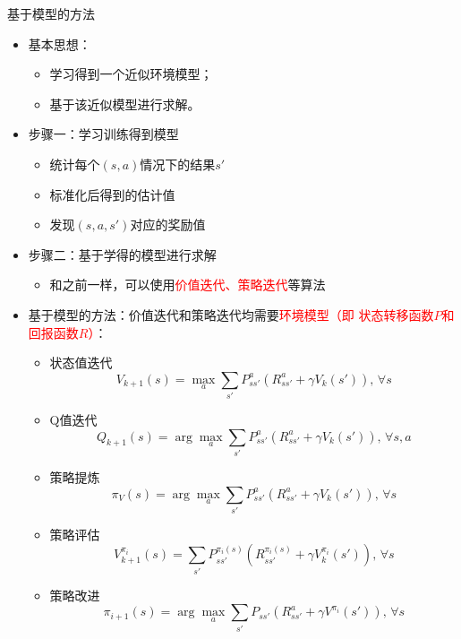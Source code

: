 \begin{note}
    基于模型的方法
    \begin{itemize}
        \item 基本思想：
        \begin{itemize}
            \item 学习得到一个近似环境模型；
            \item 基于该近似模型进行求解。
        \end{itemize}
        \item 步骤一：学习训练得到模型
        \begin{itemize}
            \item 统计每个$(s,a)$情况下的结果$s'$
            \item 标准化后得到的估计值
            \item 发现$(s,a,s')$对应的奖励值
        \end{itemize}
        \item 步骤二：基于学得的模型进行求解
        \begin{itemize}
            \item 和之前一样，可以使用\textcolor{red}{价值迭代、策略迭代}等算法
        \end{itemize}
        \item 基于模型的方法：价值迭代和策略迭代均需要\textcolor{red}{环境模型（即 状态转移函数$P$和 回报函数$R$）}：
        \begin{itemize}
            \item 状态值迭代
            \[
                V_{k+1}(s) = \max\limits_{a}\sum\limits_{s'}P_{ss'}^a\left( R_{ss'}^{a}+\gamma V_{k}(s') \right),\,\forall s
            \]
            \item Q值迭代
            \[
                Q_{k+1}(s) = \arg\max\limits_{a}\sum_{s'}P_{ss'}^{a}\left( R_{ss'}^a+\gamma V_k(s') \right),\,\forall s,a
            \]
            \item 策略提炼
            \[
                \pi_{V}(s) = \arg\max\limits_{a}\sum_{s'}P_{ss'}^a\left( R_{ss'}^a+\gamma V_k(s') \right),\,\forall s
            \]
            \item 策略评估
            \[
                V_{k+1}^{\pi_i}(s) = \sum\limits_{s'}P_{ss'}^{\pi_i(s)}\left( R_{ss'}^{\pi_i(s)}+\gamma V_{k}^{\pi_i}(s') \right),\,\forall s
            \]
            \item 策略改进
            \[
                \pi_{i+1}(s) = \arg\max\limits_{a}\sum\limits_{s'}P_{ss'}\left( R_{ss'}^a+\gamma V^{\pi_{i}}(s') \right),\,\forall s
            \]
        \end{itemize}
    \end{itemize}
\end{note}
